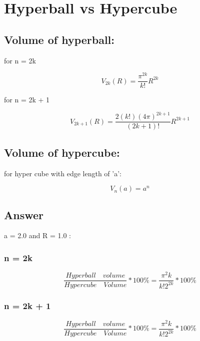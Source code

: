 \documentclass{article}
\begin{document}
\section{Hyperball vs Hypercube}


\subsection{Volume of hyperball:}
for n = 2k

\begin{equation}
  V_{2k}(R) = \dfrac{\pi^{2k}}{k!}R^{2k}
\end{equation}

for n = 2k + 1

\begin{equation}
  V_{2k+1}(R) = \dfrac{2(k!){(4\pi)}^{2k+1}}{(2k+1)!}R^{2k+1}
\end{equation}

\subsection{Volume of hypercube:}

for hyper cube with edge length of 'a':

\begin{equation}
  V_{n}(a) = a^n
\end{equation}

\subsection{Answer}

a = 2.0 and R = 1.0 :

\subsubsection{n = 2k}

\begin{equation}
  \dfrac{Hyperball \quad volume}{Hypercube \quad Volume} * 100\% =  \dfrac{\pi^2k}{k!2^{2k}} * 100\%
\end{equation}

\subsubsection{n = 2k + 1}

\begin{equation}
  \dfrac{Hyperball \quad volume}{Hypercube \quad Volume} * 100\% =  \dfrac{\pi^2k}{k!2^{2k}} * 100\%
\end{equation}
\end{document}
